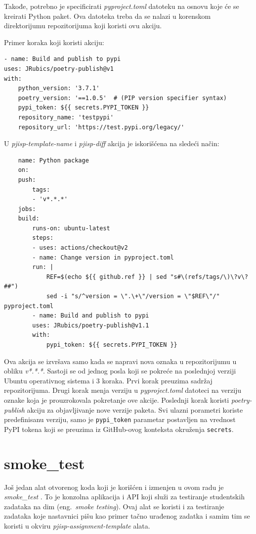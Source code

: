 \documentclass[12pt]{report}
\begin{document}
Takođe, potrebno je specificirati \textit{pyproject.toml} datoteku na osnovu koje će se kreirati Python paket. Ova datoteka treba da se nalazi u korenskom direktorijumu repozitorijuma koji koristi ovu akciju.

Primer koraka koji koristi akciju:

\begin{verbatim}
- name: Build and publish to pypi
uses: JRubics/poetry-publish@v1
with:
    python_version: '3.7.1'
    poetry_version: '==1.0.5'  # (PIP version specifier syntax)
    pypi_token: ${{ secrets.PYPI_TOKEN }}
    repository_name: 'testpypi'
    repository_url: 'https://test.pypi.org/legacy/'
\end{verbatim}


U \textit{pjisp-template-name} i \textit{pjisp-diff} akcija je iskorišćena na sledeći način:
\begin{samepage}
    \begin{verbatim}
    name: Python package
    on:
    push:
        tags:
        - 'v*.*.*'
    jobs:
    build:
        runs-on: ubuntu-latest
        steps:
        - uses: actions/checkout@v2
        - name: Change version in pyproject.toml
        run: |
            REF=$(echo ${{ github.ref }} | sed "s#\(refs/tags/\)\?v\?##")
            sed -i "s/^version = \".\+\"/version = \"$REF\"/" pyproject.toml
        - name: Build and publish to pypi
        uses: JRubics/poetry-publish@v1.1
        with:
            pypi_token: ${{ secrets.PYPI_TOKEN }}
    \end{verbatim}
\end{samepage}

Ova akcija se izvršava samo kada se napravi nova oznaka u repozitorijumu u obliku \textit{v*.*.*}. Sastoji se od jednog posla koji se pokreće na poslednjoj verziji Ubuntu operativnog sistema i 3 koraka. Prvi korak preuzima sadržaj repozitorijuma. Drugi korak menja verziju u \textit{pyproject.toml} datoteci na verziju oznake koja je prouzrokovala pokretanje ove akcije. Poslednji korak koristi \textit{poetry-publish} akciju za objavljivanje nove verzije paketa. Svi ulazni porametri koriste predefinisanu verziju, samo je \texttt{pypi\_token} parametar postavljen na vrednost PyPI tokena koji se preuzima iz GitHub-ovog konteksta okruženja \texttt{secrets}.

\section{smoke\_test}
Još jedan alat otvorenog koda koji je korišćen i izmenjen u ovom radu je \textit{smoke\_test} \cite{smoke-test}. To je konzolna aplikacija i API koji služi za testiranje studentskih zadataka na dim (eng.\ \textit{smoke testing}). Ovaj alat se koristi i za testiranje zadataka koje nastavnici pišu kao primer tačno urađenog zadatka i samim tim se koristi u okviru \textit{pjisp-assignment-template} alata.
\end{document}
